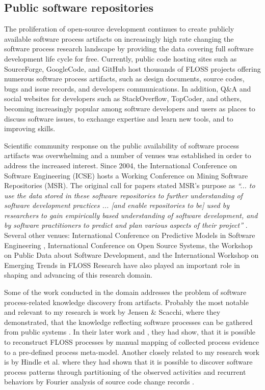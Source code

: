 \subsection{Public software repositories}
The proliferation of open-source development continues to create publicly available software process 
artifacts on increasingly high rate changing the software process research landscape by providing 
the data covering full software development life cycle for free. 
Currently, public code hosting sites such as SourceForge, GoogleCode, and GitHub host thousands of FLOSS 
projects offering numerous software process artifacts, such as design documents, source codes, bugs and 
issue records, and developers communications.
In addition, Q\&A and social websites for developers such as StackOverflow, TopCoder, and others, becoming 
increasingly popular among software developers and users as places to discuss software issues, 
to exchange expertise and learn new tools, and to improving skills.

Scientific community response on the public availability of software process artifacts was overwhelming 
and a number of venues was established in order to address the increased interest. 
Since 2004, the International Conference on Software Engineering (ICSE) hosts a Working Conference on 
Mining Software Repositories (MSR). The original call for papers stated MSR's purpose as 
\textit{``... to use the data stored in these software repositories to further understanding of software 
development practices ... [and enable repositories to be] used by researchers to gain empirically based 
understanding of software development, and by software practitioners to predict and plan various aspects 
of their project''} \cite{msr2004} \cite{citeulike:7853299}. 
Several other venues: International Conference on Predictive Models in Software Engineering \cite{promise12}, 
International Conference on Open Source Systems, the Workshop on Public Data about Software Development, 
and the International Workshop on Emerging Trends in FLOSS Research have also played
an important role in shaping and advancing of this research domain.

Some of the work conducted in the domain addresses the problem of software process-related 
knowledge discovery from artifacts. Probably the most notable and relevant to 
my research is work by Jensen \& Scacchi, where they demonstrated, that the knowledge
reflecting software processes can be gathered from public systems \cite{citeulike:12550640}. 
In their later work\cite{citeulike:5043664} and \cite{citeulike:5128808}, they had show, that it is possible to 
reconstruct FLOSS processes by manual mapping of collected process evidence 
to a pre-defined process meta-model. 
Another closely related to my research work is by Hindle et al. where they had shown that it is possible to 
discover software process patterns through partitioning of the observed activities \cite{citeulike:10377366} 
and recurrent behaviors by Fourier analysis of source code change records \cite{citeulike:10377345}.

